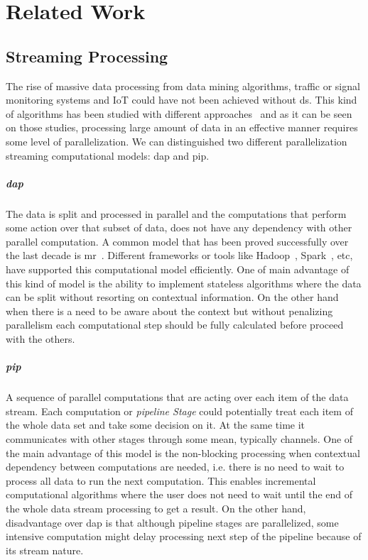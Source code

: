 \chapter{Related Work}
\section{Streaming Processing}
The rise of massive data processing from data mining algorithms, traffic or signal monitoring systems and IoT could have not been 
achieved without \acrfull{ds}. This kind of algorithms has been studied with different approaches~\cite{enumeratingsg, exploting, onthefly} and as
it can be seen on those studies, processing large amount of data in an effective manner requires some level of parallelization.
We can distinguished two different parallelization streaming computational models: \acrfull{dap} and \acrfull{pip}. 

\paragraph{\acrlong{dap}} The data is split and processed in parallel and the computations that perform some action over that subset of data, does not have any dependency with other parallel computation. 
A common model that has been proved successfully over the last decade is \acrfull{mr}~\cite{mapreduce}. Different frameworks or tools like Hadoop~\cite{hadoop}, Spark~\cite{apachespark}, etc, have supported this computational 
model efficiently. One of main advantage of this kind of model is the ability to implement stateless algorithms where the data can be split without resorting on contextual information. On the other hand
when there is a need to be aware about the context but without penalizing parallelism each computational step should be fully calculated before proceed with the others.

\paragraph{\acrlong{pip}} A sequence of parallel computations that are acting over each item of the data stream. Each computation or \emph{pipeline Stage} could potentially
treat each item of the whole data set and take some decision on it. At the same time it communicates with other stages through some mean, typically channels. One of the main advantage of this model is the non-blocking processing
when contextual dependency between computations are needed, i.e. there is no need to wait to process all data to run the next computation. This enables incremental computational algorithms where the user does not need to 
wait until the end of the whole data stream processing to get a result. On the other hand, disadvantage over \acrshort{dap} is that although pipeline stages are parallelized, 
some intensive computation might delay processing next step of the pipeline because of its stream nature. 

